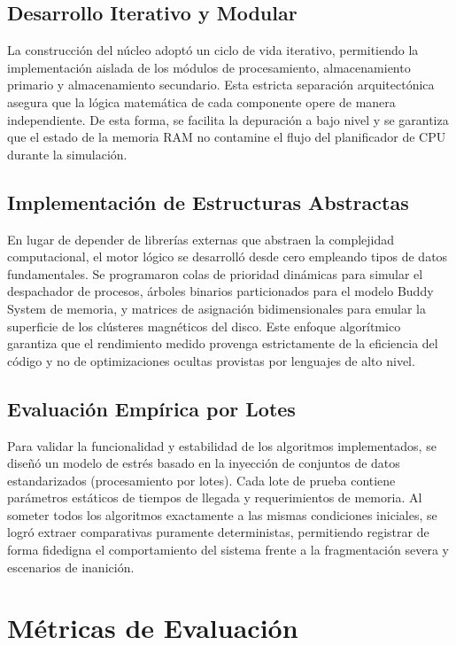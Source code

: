 \documentclass[12pt,a4paper]{article}
\begin{document}
\subsection{Desarrollo Iterativo y Modular}
La construcción del núcleo adoptó un ciclo de vida iterativo, permitiendo la implementación aislada de los módulos de procesamiento, almacenamiento primario y almacenamiento secundario. Esta estricta separación arquitectónica asegura que la lógica matemática de cada componente opere de manera independiente. De esta forma, se facilita la depuración a bajo nivel y se garantiza que el estado de la memoria RAM no contamine el flujo del planificador de CPU durante la simulación.

\subsection{Implementación de Estructuras Abstractas}
En lugar de depender de librerías externas que abstraen la complejidad computacional, el motor lógico se desarrolló desde cero empleando tipos de datos fundamentales. Se programaron colas de prioridad dinámicas para simular el despachador de procesos, árboles binarios particionados para el modelo Buddy System de memoria, y matrices de asignación bidimensionales para emular la superficie de los clústeres magnéticos del disco. Este enfoque algorítmico garantiza que el rendimiento medido provenga estrictamente de la eficiencia del código y no de optimizaciones ocultas provistas por lenguajes de alto nivel.

\subsection{Evaluación Empírica por Lotes}
Para validar la funcionalidad y estabilidad de los algoritmos implementados, se diseñó un modelo de estrés basado en la inyección de conjuntos de datos estandarizados (procesamiento por lotes). Cada lote de prueba contiene parámetros estáticos de tiempos de llegada y requerimientos de memoria. Al someter todos los algoritmos exactamente a las mismas condiciones iniciales, se logró extraer comparativas puramente deterministas, permitiendo registrar de forma fidedigna el comportamiento del sistema frente a la fragmentación severa y escenarios de inanición.

\section{Métricas de Evaluación}
\end{document}
